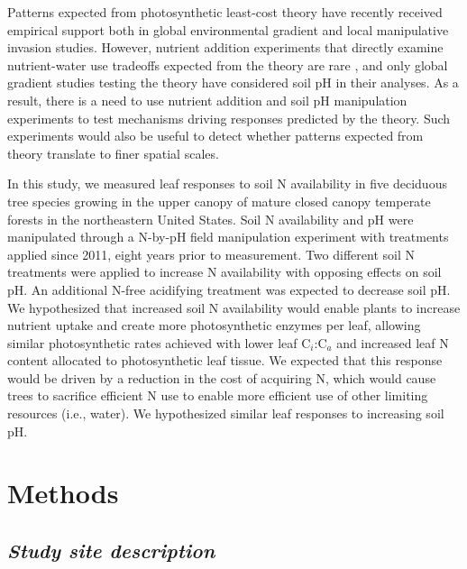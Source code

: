     Patterns expected from photosynthetic least-cost theory have recently received empirical support both in global environmental gradient  and local manipulative invasion  studies. However, nutrient addition experiments that directly examine nutrient-water use tradeoffs expected from the theory are rare , and only global gradient studies testing the theory have considered soil pH in their analyses. As a result, there is a need to use nutrient addition and soil pH manipulation experiments to test mechanisms driving responses predicted by the theory. Such experiments would also be useful to detect whether patterns expected from theory translate to finer spatial scales.

    In this study, we measured leaf responses to soil N availability in five deciduous tree species growing in the upper canopy of mature closed canopy temperate forests in the northeastern United States. Soil N availability and pH were manipulated through a N-by-pH field manipulation experiment with treatments applied since 2011, eight years prior to measurement. Two different soil N treatments were applied to increase N availability with opposing effects on soil pH. An additional N-free acidifying treatment was expected to decrease soil pH. We hypothesized that increased soil N availability would enable plants to increase nutrient uptake and create more photosynthetic enzymes per leaf, allowing similar photosynthetic rates achieved with lower leaf C$_{i}$:C$_{a}$ and increased leaf N content allocated to photosynthetic leaf tissue. We expected that this response would be driven by a reduction in the cost of acquiring N, which would cause trees to sacrifice efficient N use to enable more efficient use of other limiting resources (i.e., water). We hypothesized similar leaf responses to increasing soil pH.

    \section{Methods}

    \subsection{\textit{Study site description}}

